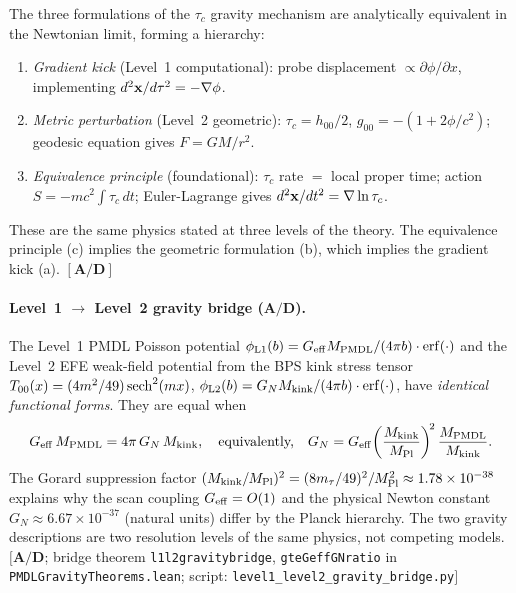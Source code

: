 \documentclass[11pt]{article}
\theoremstyle{remark}
\newcommand{\lean}[1]{%
  \penalty-100
  \begingroup\def\_{\textunderscore\allowbreak}\texttt{#1}\endgroup}
\newcommand{\CatAD}{\textbf{A/D}}
\begin{document}
The three formulations of the $\tau_c$ gravity mechanism are analytically
equivalent in the Newtonian limit, forming a hierarchy:
\begin{enumerate}[noitemsep,label=(\alph*)]
\item \emph{Gradient kick} (Level~1 computational): probe displacement $\propto \partial\phi/\partial x$,
      implementing $d^2{\bf x}/d\tau^2 = -\nabla\phi$.
\item \emph{Metric perturbation} (Level~2 geometric): $\tau_c = h_{00}/2$,
      $g_{00} = -(1 + 2\phi/c^2)$; geodesic equation gives $F = GM/r^2$.
\item \emph{Equivalence principle} (foundational): $\tau_c$ rate $=$ local proper time;
      action $S = -mc^2\int\tau_c\,dt$; Euler-Lagrange gives $d^2{\bf x}/dt^2 = \nabla\ln\tau_c$.
\end{enumerate}
These are the same physics stated at three levels of the theory.
The equivalence principle (c) implies the geometric formulation (b),
which implies the gradient kick (a). $[\CatAD]$

\paragraph{Level~1 $\to$ Level~2 gravity bridge ($\CatAD$).}
The Level~1 PMDL Poisson potential $\phi_{\rm L1}(b) = G_{\rm eff}M_{\rm PMDL}/(4\pi b)\cdot{\rm erf}(\cdot)$
and the Level~2 EFE weak-field potential from the BPS kink stress tensor
$T_{00}(x) = (4m^2/49)\,{\rm sech}^2(mx)$,
$\phi_{\rm L2}(b) = G_N M_{\rm kink}/(4\pi b)\cdot{\rm erf}(\cdot)$,
have \emph{identical functional forms}.  They are equal when
\begin{equation}
  G_{\rm eff}\,M_{\rm PMDL} = 4\pi\,G_N\,M_{\rm kink},
  \quad\text{equivalently,}\quad
  G_N = G_{\rm eff}\!\left(\frac{M_{\rm kink}}{M_{\rm Pl}}\right)^{\!2}\frac{M_{\rm PMDL}}{M_{\rm kink}}.
  \label{eq:gravity-bridge}
\end{equation}
The Gorard suppression factor $(M_{\rm kink}/M_{\rm Pl})^2 = (8m_\tau/49)^2/M_{\rm Pl}^2
\approx 1.78\times10^{-38}$ explains why the scan coupling $G_{\rm eff} = O(1)$
and the physical Newton constant $G_N \approx 6.67\times10^{-37}$ (natural units)
differ by the Planck hierarchy.  The two gravity descriptions are two resolution levels
of the same physics, not competing models.
$[\CatAD$; bridge theorem \lean{l1\_l2\_gravity\_bridge}, \lean{gte\_G\_eff\_G\_N\_ratio}
in \lean{PMDLGravityTheorems.lean};
script: \texttt{level1\_level2\_gravity\_bridge.py}$]$
\end{document}
